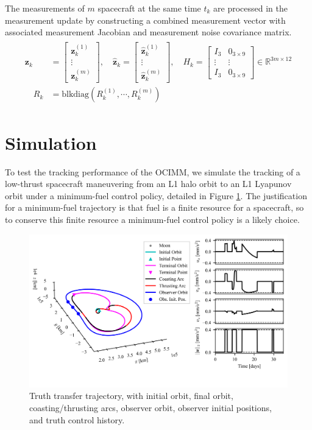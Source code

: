 \documentclass[letterpaper, preprint, paper,11pt]{AAS}	%
\newcommand{\R}{\mathbb{R}}
\begin{document}
The measurements of $m$ spacecraft at the same time $t_k$ are processed in the measurement update by constructing a combined measurement vector with associated measurement Jacobian and measurement noise covariance matrix. 
\begin{align}
\begin{aligned}
    \bm{z}_k &= \begin{bmatrix}
        \bm{z}_k^{(1)} \\
        \vdots \\
        \bm{z}_k^{(m)}
    \end{bmatrix}, \quad \hat{\bm{z}}_k = \begin{bmatrix}
        \hat{\bm{z}}_k^{(1)} \\
        \vdots \\
        \hat{\bm{z}}_k^{(m)}
    \end{bmatrix}, \quad H_k = \begin{bmatrix}
        I_3 & 0_{3\times9} \\
        \vdots & \vdots \\
        I_3 & 0_{3\times9}
    \end{bmatrix} \in \R^{3m \times 12} \\
    \quad R_k &= \text{blkdiag}(R_k^{(1)}, \cdots, R_k^{(m)})
\end{aligned}
\end{align}

\section{Simulation}

To test the tracking performance of the OCIMM, we simulate the tracking of a low-thrust spacecraft maneuvering from an L1 halo orbit to an L1 Lyapunov orbit under a minimum-fuel control policy, detailed in Figure \ref{fig:truth_trajectory}. The justification for a minimum-fuel trajectory is that fuel is a finite resource for a spacecraft, so to conserve this finite resource a minimum-fuel control policy is a likely choice.

\begin{figure}
    \centering
    \includegraphics[width=\linewidth]{Figures/truth_trajectory.png}
    \caption{Truth transfer trajectory, with initial orbit, final orbit, coasting/thrusting arcs, observer orbit, observer initial positions, and truth control history.}
    \label{fig:truth_trajectory}
\end{figure}
\end{document}
